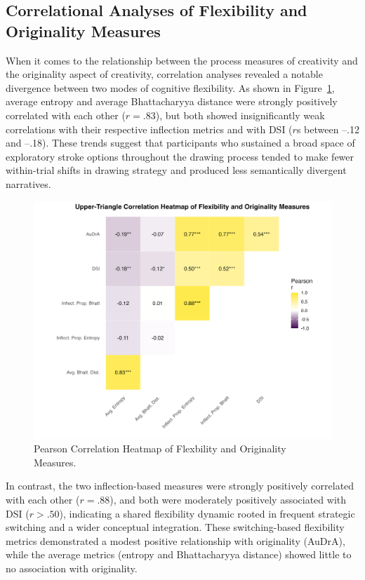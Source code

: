 \documentclass[../MA_Thesis.tex]{subfiles}
\begin{document}
\subsection*{Correlational Analyses of Flexibility and Originality Measures}

When it comes to the relationship between the process measures of creativity and the originality aspect of creativity, correlation analyses revealed a notable divergence between two modes of cognitive flexibility. As shown in Figure~\ref{fig:cor_heatmap}, average entropy and average Bhattacharyya distance were strongly positively correlated with each other ($r = .83$), but both showed insignificantly weak correlations with their respective inflection metrics and with DSI ($r$s between –.12 and –.18). These trends suggest that participants who sustained a broad space of exploratory stroke options throughout the drawing process tended to make fewer within-trial shifts in drawing strategy and produced less semantically divergent narratives.

\begin{figure}[H]
  \centering
  \includegraphics[width=\textwidth]{../analysis/results/main_results/correlation/correlation_heatmap.png}
  \caption{
    Pearson Correlation Heatmap of Flexbility and Originality Measures.
  }
  \label{fig:cor_heatmap}
\end{figure}

In contrast, the two inflection-based measures were strongly positively correlated with each other ($r = .88$), and both were moderately positively associated with DSI ($r > .50$), indicating a shared flexibility dynamic rooted in frequent strategic switching and a wider conceptual integration. These switching-based flexibility metrics demonstrated a modest positive relationship with originality (AuDrA), while the average metrics (entropy and Bhattacharyya distance) showed little to no association with originality.
\end{document}
